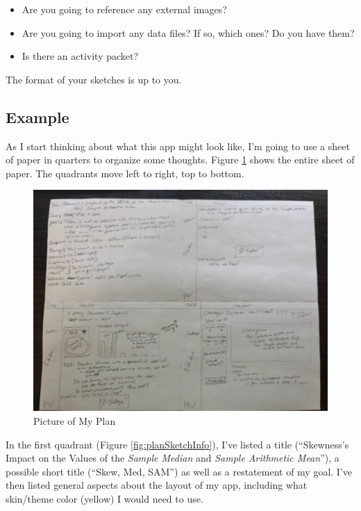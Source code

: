 \documentclass[
]{book}
\providecommand{\tightlist}{%
  \setlength{\itemsep}{0pt}\setlength{\parskip}{0pt}}
\begin{document}
\begin{itemize}
  \begin{itemize}
  \tightlist
  \item
    Are you going to reference any external images?
  \item
    Are you going to import any data files? If so, which ones? Do you have them?
  \item
    Is there an activity packet?
  \end{itemize}
\end{itemize}

The format of your sketches is up to you.

\hypertarget{example-1}{%
\subsection{Example}\label{example-1}}

As I start thinking about what this app might look like, I'm going to use a sheet of paper in quarters to organize some thoughts. Figure \ref{fig:planSketchFull} shows the entire sheet of paper. The quadrants move left to right, top to bottom.

\begin{figure}

{\centering \includegraphics[width=22.22in]{images/planSketches/planSketch1} 

}

\caption{Picture of My Plan}\label{fig:planSketchFull}
\end{figure}

In the first quadrant (Figure \ref{fig:planSketchInfo}), I've listed a title (``Skewness's Impact on the Values of the \emph{Sample Median} and \emph{Sample Arithmetic Mean}''), a possible short title (``Skew, Med, SAM'') as well as a restatement of my goal. I've then listed general aspects about the layout of my app, including what skin/theme color (yellow) I would need to use.
\end{document}
